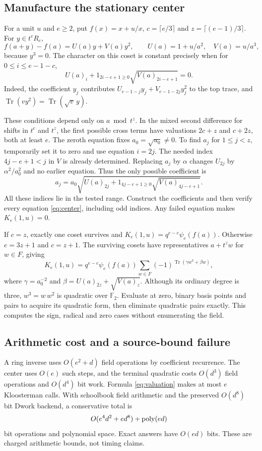 \documentclass[11pt]{article}
\theoremstyle{remark}\newtheorem{remark}[theorem]{Remark}
\newcommand{\F}{\mathbb F}\newcommand{\Tr}{\operatorname{Tr}}
\begin{document}
\subsection{Manufacture the stationary center}
For a unit $u$ and $e\ge2$, put
$f(x)=x+u/x$, $c=\lceil e/3\rceil$ and $z=\lceil(e-1)/3\rceil$.
For $y\in t^cR_e$,
\[
 f(a+y)-f(a)=U(a)y+V(a)y^2,\qquad U(a)=1+u/a^2,\quad V(a)=u/a^3,
\]
because $y^3=0$. The character on this coset is constant precisely when
for $0\le i\le e-1-c$,
\begin{equation}\label{eq:center}
 U(a)_i+1_{2i-e+1\ge0}\sqrt{V(a)_{2i-e+1}}=0.
\end{equation}
Indeed, the coefficient $y_j$ contributes
$U_{e-1-j}y_j+V_{e-1-2j}y_j^2$ to the top trace, and
$\Tr(vy^2)=\Tr(\sqrt v\,y)$.

These conditions depend only on $a\bmod t^z$. In the mixed second
difference for shifts in $t^c$ and $t^z$, the first possible cross terms
have valuations $2c+z$ and $c+2z$, both at least $e$.
The zeroth equation fixes $a_0=\sqrt{u_0}\ne0$. To find $a_j$ for
$1\le j<z$, temporarily set it to zero and use equation $i=2j$.
The needed index $4j-e+1<j$ in $V$ is already determined. Replacing
$a_j$ by $\alpha$ changes $U_{2j}$ by $\alpha^2/a_0^2$ and no earlier
equation. Thus the only possible coefficient is
\[
 a_j=a_0\sqrt{U(a)_{2j}
             +1_{4j-e+1\ge0}\sqrt{V(a)_{4j-e+1}}}.
\]
All these indices lie in the tested range. Construct the coefficients
and then verify every equation \eqref{eq:center}, including odd indices.
Any failed equation makes $K_e(1,u)=0$.

If $c=z$, exactly one coset survives and
$K_e(1,u)=q^{e-c}\psi_e(f(a))$.
Otherwise $e=3z+1$ and $c=z+1$. The surviving cosets have representatives
$a+t^zw$ for $w\in F$, giving
\begin{equation}\label{eq:gauss}
 K_e(1,u)=q^{e-c}\psi_e(f(a))
       \sum_{w\in F}(-1)^{\Tr(\gamma w^3+\beta w)},
\end{equation}
where $\gamma=a_0^{-2}$ and $\beta=U(a)_{2z}+\sqrt{V(a)_z}$.
Although its ordinary degree is three, $w^3=w\,w^2$ is quadratic over
$\F_2$. Evaluate at zero, binary basis points and pairs to acquire its
quadratic form, then eliminate quadratic pairs exactly. This computes
the sign, radical and zero cases without enumerating the field.

\subsection{Arithmetic cost and a source-bound failure}
A ring inverse uses $O(e^2+d)$ field operations by coefficient recurrence.
The center uses $O(e)$ such steps, and the terminal quadratic costs
$O(d^3)$ field operations and $O(d^4)$ bit work. Formula
\eqref{eq:valuation} makes at most $e$ Kloosterman calls.
With schoolbook field arithmetic and the preserved $O(d^8)$ bit
Dwork backend, a conservative total is
\[
 O(e^4d^2+ed^8)+\operatorname{poly}(ed)
\]
bit operations and polynomial space. Exact answers have $O(ed)$ bits.
These are charged arithmetic bounds, not timing claims.
\end{document}
